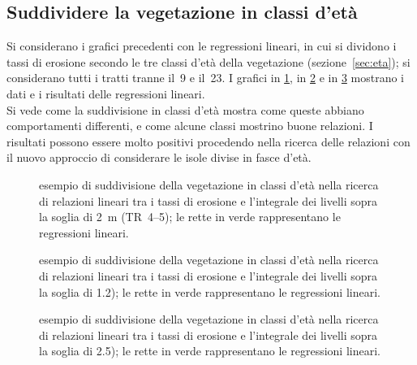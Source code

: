 \subsection{Suddividere la vegetazione in classi d'età}
Si considerano i grafici precedenti con le regressioni lineari, in cui si dividono i tassi di erosione secondo le tre classi d'età della vegetazione (sezione~\ref{sec:eta}); si considerano tutti i tratti tranne il~9 e il~23.
I grafici in \cref{graph:tr-05-iote-classi-eta-lin}, in \cref{graph:tr-12-iote-classi-eta-lin} e in \cref{graph:tr-25-iote-classi-eta-lin} mostrano i dati e i risultati delle regressioni lineari.
\\
Si vede come la suddivisione in classi d'età mostra come queste abbiano comportamenti differenti, e come alcune classi mostrino buone relazioni.
I risultati possono essere molto positivi procedendo nella ricerca delle relazioni con il nuovo approccio di considerare le isole divise in fasce d'età.
%
\begin{figure}
	\centering
	
	\caption[suddivisione in classi d'età ricercando relazioni tra erosione e piene con livello maggiore di \SI{2}{\m}]{esempio di suddivisione della vegetazione in classi d'età nella ricerca di relazioni lineari tra i tassi di erosione e l'integrale dei livelli sopra la soglia di \SI{2}{\m} (TR~\SIrange[range-phrase = {-}, range-units = single]{4}{5}{\mesi}); le rette in verde rappresentano le regressioni lineari.}
	\label{graph:tr-05-iote-classi-eta-lin}
\end{figure}
%
%
\begin{figure}
	\centering
	
	\caption[suddivisione in classi d'età ricercando relazioni tra erosione e piene con con livello maggiore di \SI{2.5}{\m}]{esempio di suddivisione della vegetazione in classi d'età nella ricerca di relazioni lineari tra i tassi di erosione e l'integrale dei livelli sopra la soglia di \SI{1.2}{\anni}); le rette in verde rappresentano le regressioni lineari.}
	\label{graph:tr-12-iote-classi-eta-lin}
\end{figure}
%
%
\begin{figure}
	\centering
	
	\caption[suddivisione in classi d'età ricercando relazioni tra erosione e piene con con livello maggiore di \SI{2.9}{\m}]{esempio di suddivisione della vegetazione in classi d'età nella ricerca di relazioni lineari tra i tassi di erosione e l'integrale dei livelli sopra la soglia di \SI{2.5}{\anni}); le rette in verde rappresentano le regressioni lineari.}
	\label{graph:tr-25-iote-classi-eta-lin}
\end{figure}
%




